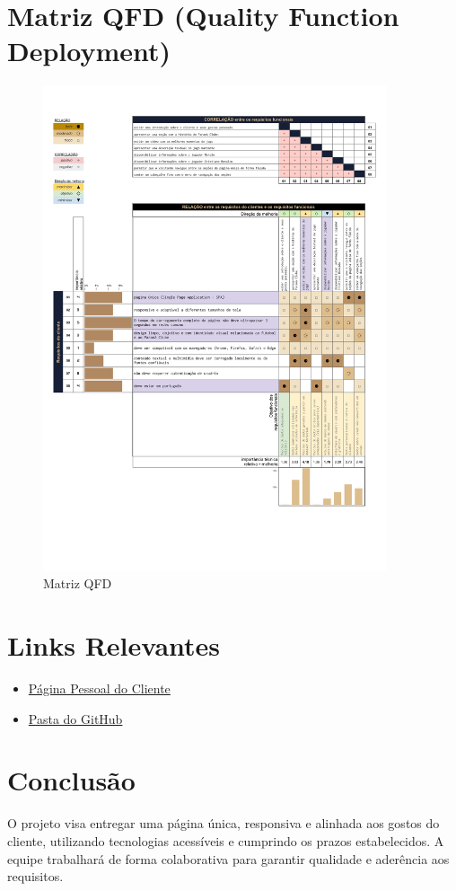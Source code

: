 \documentclass[12pt,a4paper]{article}
\begin{document}
\section{Matriz QFD (Quality Function Deployment)}
\begin{figure}[H]
    \centering
    \includegraphics[width=0.9\textwidth]{matrix-qfd.jpg}
    \caption{Matriz QFD}
\end{figure}

\section{Links Relevantes}
\begin{itemize}
    \item \href{https://luigi-rs.github.io/Web-Projects/APS/}{Página Pessoal do Cliente}
    \item \href{https://github.com/Luigi-RS/Web-Projects/tree/main/APS}{Pasta do GitHub}
\end{itemize}

\section{Conclusão}
O projeto visa entregar uma página única, responsiva e alinhada aos gostos do cliente, utilizando tecnologias acessíveis e cumprindo os prazos estabelecidos. A equipe trabalhará de forma colaborativa para garantir qualidade e aderência aos requisitos.
\end{document}
